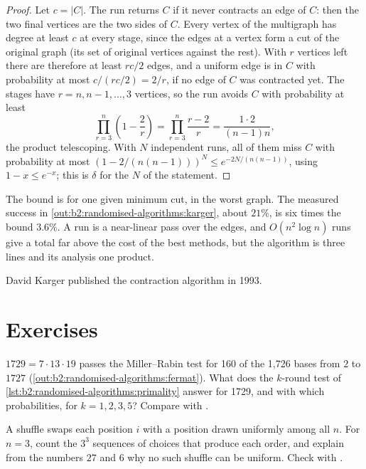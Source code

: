 \begin{proof}
Let $c = |C|$. The run returns $C$ if it never contracts an edge of $C$: then the two final vertices are the two sides of
$C$. Every vertex of the multigraph has degree at least $c$ at every stage, since the edges at a vertex form a cut of the
original graph (its set of original vertices against the rest). With $r$ vertices left there are therefore at least $rc/2$
edges, and a uniform edge is in $C$ with probability at most $c/(rc/2) = 2/r$, if no edge of $C$ was contracted yet. The
stages have $r = n, n - 1, \dots, 3$ vertices, so the run avoids $C$ with probability at least
\[
\prod_{r = 3}^{n} \left(1 - \frac{2}{r}\right) = \prod_{r = 3}^{n} \frac{r - 2}{r} = \frac{1 \cdot 2}{(n - 1) n},
\]
the product telescoping. With $N$ independent runs, all of them miss $C$ with probability at most $(1 - 2/(n(n -
1)))^N \leq e^{-2N/(n(n - 1))}$, using $1 - x \leq e^{-x}$; this is $\delta$ for the $N$ of the statement.
\end{proof}

The bound is for one given minimum cut, in the worst graph. The measured success in
\cref{out:b2:randomised-algorithms:karger}, about $21\%$, is six times the bound $3.6\%$. A run is a near-linear pass over
the edges, and $O(n^2 \log n)$ runs give a total far above the cost of the best methods, but the algorithm is three lines
and its analysis one product.

\begin{history}
David Karger published the contraction algorithm in 1993.
\end{history}

\section{Exercises}\label{sec:b2:randomised-algorithms:exercises}

\begin{exercise}[$\star$]\label{exo:b2:randomised-algorithms:1}
$1729 = 7 \cdot 13 \cdot 19$ passes the Miller--Rabin test for 160 of the 1,726 bases from $2$ to $1727$
(\cref{out:b2:randomised-algorithms:fermat}). What does the $k$-round test of \cref{lst:b2:randomised-algorithms:primality}
answer for 1729, and with which probabilities, for $k = 1, 2, 3, 5$? Compare with .
\end{exercise}

\begin{exercise}[$\star$]\label{exo:b2:randomised-algorithms:2}
A shuffle swaps each position $i$ with a position drawn uniformly among all $n$. For $n = 3$, count the $3^3$ sequences of
choices that produce each order, and explain from the numbers $27$ and $6$ why no such shuffle can be uniform. Check with
.
\end{exercise}


